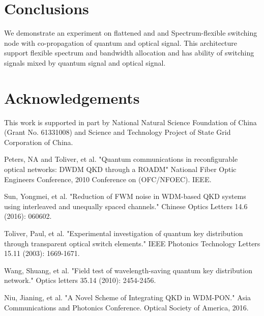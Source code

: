 \documentclass[letterpaper,10pt]{article}
\begin{document}
\section{Conclusions}
We demonstrate an experiment on flattened and  and Spectrum-flexible switching node with co-propagation of quantum and optical signal. This architecture support flexible spectrum and bandwidth allocation and has ability of switching signals mixed by quantum signal and optical signal.

\section{Acknowledgements}
This work is supported in part by National Natural Science Foundation of China (Grant No. 61331008) and Science and Technology Project of State Grid Corporation of China.



\begin{thebibliography}{99}

 Peters, NA and Toliver, et al. "Quantum communications in reconfigurable optical networks: DWDM QKD through a ROADM" National Fiber Optic Engineers Conference, 2010 Conference on (OFC/NFOEC). IEEE.

 Sun, Yongmei, et al. "Reduction of FWM noise in WDM-based QKD systems using interleaved and unequally spaced channels." Chinese Optics Letters 14.6 (2016): 060602.

 Toliver, Paul, et al. "Experimental investigation of quantum key distribution through transparent optical switch elements." IEEE Photonics Technology Letters 15.11 (2003): 1669-1671.

 Wang, Shuang, et al. "Field test of wavelength-saving quantum key distribution network." Optics letters 35.14 (2010): 2454-2456.

 Niu, Jianing, et al. "A Novel Scheme of Integrating QKD in WDM-PON." Asia Communications and Photonics Conference. Optical Society of America, 2016.

\end{thebibliography}
\end{document}
